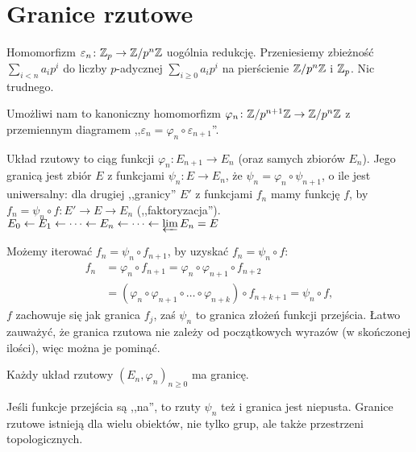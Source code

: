 \section{Granice rzutowe}
Homomorfizm  $\varepsilon_n \colon \mathbb Z_p \to \mathbb Z/p^n\mathbb Z$ uogólnia redukcję.
Przeniesiemy zbieżność $\sum_{i < n} a_ip^i$ do liczby $p$-adycznej $\sum_{i \ge 0} a_i p^i$ na pierścienie $\mathbb Z/p^n\mathbb Z$ i $\mathbb Z_p$.
Nic trudnego.

Umożliwi nam to kanoniczny homomorfizm $\varphi_n \colon \mathbb Z/p^{n+1} \mathbb Z \to \mathbb Z / p^n \mathbb Z$ z przemiennym diagramem ,,$\varepsilon_n = \varphi_n \circ \varepsilon_{n+1}$''.

\begin{definicja}
	Układ  rzutowy to ciąg funkcji $\varphi_n \colon E_{n+1} \to E_n$ (oraz samych zbiorów $E_n$). 
	Jego granicą jest zbiór $E$ z funkcjami $\psi_n \colon E \to E_n$, że $\psi_n = \varphi_n \circ \psi_{n+1}$, o ile jest uniwersalny: dla drugiej ,,granicy'' $E'$ z funkcjami $f_n$ mamy funkcję $f$, by $f_n = \psi_n \circ f \colon E' \to E \to E_n$ (,,faktoryzacja'').
	$E_0 \leftarrow E_1 \leftarrow \dots \leftarrow E_n \leftarrow \dots \leftarrow \varprojlim E_n = E$
\end{definicja}

Możemy iterować $f_n = \psi_n \circ f_{n+1}$, by uzyskać $f_n = \psi_n \circ f$:
\begin{align*}
	f_n & = \varphi_n \circ f_{n+1} = \varphi_n \circ \varphi_{n+1} \circ f_{n+2} \\
	& = (\varphi_n \circ \varphi_{n+1} \circ \ldots \circ \varphi_{n+k}) \circ f_{n+k+1} = \psi_n \circ f,
\end{align*}
$f$ zachowuje się jak granica $f_j$, zaś $\psi_n$ to granica złożeń funkcji przejścia.
Łatwo zauważyć, że granica rzutowa nie zależy od początkowych wyrazów (w skończonej ilości), więc można je pominąć.

\begin{fakt}
	Każdy  układ rzutowy $(E_n, \varphi_n)_{n \ge 0}$ ma granicę.
\end{fakt}

Jeśli funkcje przejścia są ,,na'', to rzuty $\psi_n$ też i granica jest niepusta.
Granice rzutowe istnieją dla wielu obiektów, nie tylko grup, ale także  przestrzeni topologicznych.

